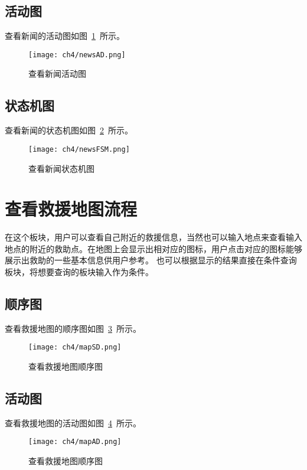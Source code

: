 \subsection{活动图}
查看新闻的活动图如图~\ref{fig:newsAD}~所示。
\begin{figure}[htbp]
    \centering
    \texttt{[image: ch4/newsAD.png]}
    \caption{查看新闻活动图}\label{fig:newsAD}
    \vspace{\baselineskip} %
\end{figure}
\subsection{状态机图}
查看新闻的状态机图如图~\ref{fig:newsFSM}~所示。
\begin{figure}[htbp]
    \centering
    \texttt{[image: ch4/newsFSM.png]}
    \caption{查看新闻状态机图}\label{fig:newsFSM}
    \vspace{\baselineskip} %
\end{figure}

\section{查看救援地图流程}
在这个板块，用户可以查看自己附近的救援信息，当然也可以输入地点来查看输入地点的附近的救助点。在地图上会显示出相对应的图标，用户点击对应的图标能够展示出救助的一些基本信息供用户参考。
也可以根据显示的结果直接在条件查询板块，将想要查询的板块输入作为条件。
\subsection{顺序图}
查看救援地图的顺序图如图~\ref{fig:mapSD}~所示。
\begin{figure}[htbp]
    \centering
    \texttt{[image: ch4/mapSD.png]}
    \caption{查看救援地图顺序图}\label{fig:mapSD}
    \vspace{\baselineskip} %
\end{figure}
\subsection{活动图}
查看救援地图的活动图如图~\ref{fig:mapAD}~所示。
\begin{figure}[htbp]
    \centering
    \texttt{[image: ch4/mapAD.png]}
    \caption{查看救援地图顺序图}\label{fig:mapAD}
    \vspace{\baselineskip} %
\end{figure}
